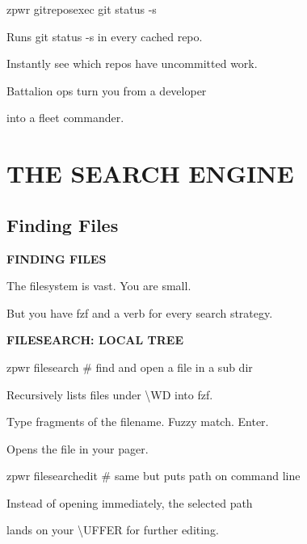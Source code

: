 \documentclass[11pt,a4paper,twoside]{book}
\begin{document}
\begin{codebox}
zpwr gitreposexec git status -s\\
\end{codebox}

Runs git status -s in every cached repo.

Instantly see which repos have uncommitted work.

Battalion ops turn you from a developer

into a fleet commander.


\vspace{16pt}


\chapter{THE SEARCH ENGINE}

\section{Finding Files}


\vspace{10pt}
{\large\bfseries\color{neoncyan} FINDING FILES}\vspace{6pt}

The filesystem is vast. You are small.

But you have fzf and a verb for every search strategy.


\vspace{12pt}
{\bfseries\color{neonyellow} FILESEARCH: LOCAL TREE}\vspace{4pt}

\begin{codebox}
zpwr filesearch          \# find and open a file in a sub dir\\
\end{codebox}

Recursively lists files under \textbackslash{}WD into fzf.

Type fragments of the filename. Fuzzy match. Enter.

Opens the file in your pager.

\begin{codebox}
zpwr filesearchedit      \# same but puts path on command line\\
\end{codebox}

Instead of opening immediately, the selected path

lands on your \textbackslash{}UFFER for further editing.
\end{document}
